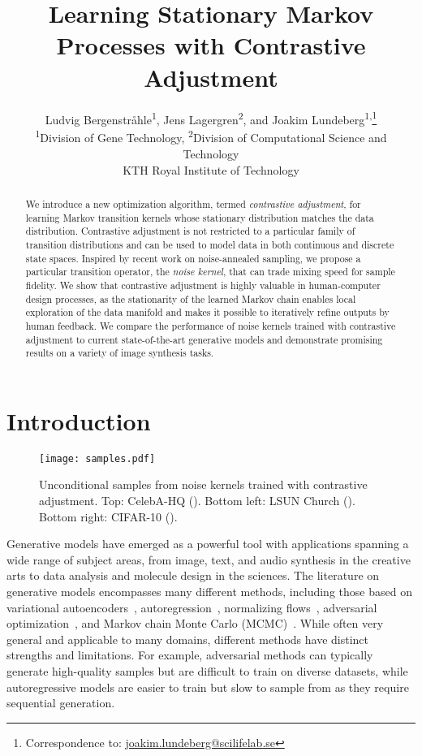 \documentclass[10pt,twocolumn,letterpaper]{article}
\title{Learning Stationary Markov Processes with Contrastive Adjustment}
\author{
  Ludvig Bergenstråhle\textsuperscript{1},
  Jens Lagergren\textsuperscript{2}, and
  Joakim Lundeberg\textsuperscript{1,}\thanks{Correspondence to: \href{mailto:joakim.lundeberg@scilifelab.se}{joakim.lundeberg@scilifelab.se}}
  \\
  {\small
    \textsuperscript{1}Division of Gene Technology,
    \textsuperscript{2}Division of Computational Science and Technology
  }
  \\
  {\small KTH Royal Institute of Technology}
}
\begin{document}
\maketitle

\begin{abstract}
  We introduce a new optimization algorithm, termed \emph{contrastive adjustment}, for learning Markov transition kernels whose stationary distribution matches the data distribution.
  Contrastive adjustment is not restricted to a particular family of transition distributions and can be used to model data in both continuous and discrete state spaces.
  Inspired by recent work on noise-annealed sampling, we propose a particular transition operator, the \emph{noise kernel}, that can trade mixing speed for sample fidelity.
  We show that contrastive adjustment is highly valuable in human-computer design processes, as the stationarity of the learned Markov chain enables local exploration of the data manifold and makes it possible to iteratively refine outputs by human feedback.
  We compare the performance of noise kernels trained with contrastive adjustment to current state-of-the-art generative models and demonstrate promising results on a variety of image synthesis tasks.
\end{abstract}


\section{Introduction}

\begin{figure}[t]
  \centering
  \texttt{[image: samples.pdf]}\caption{
    Unconditional samples from noise kernels trained with contrastive adjustment.
    Top: CelebA-HQ ().
    Bottom left: LSUN Church ().
    Bottom right: CIFAR-10 ().
  }\label{fig:ca:samples}
\end{figure}

Generative models have emerged as a powerful tool with applications spanning a wide range of subject areas, from image, text, and audio synthesis in the creative arts to data analysis and molecule design in the sciences.
The literature on generative models encompasses many different methods, including those based on variational autoencoders~\cite{kingma2013auto}, autoregression~\cite{oord2016conditional}, normalizing flows~\cite{rezende2015variational}, adversarial optimization~\cite{goodfellow2014generative}, and Markov chain Monte Carlo (MCMC)~\cite{song2019generative}.
While often very general and applicable to many domains, different methods have distinct strengths and limitations.
For example, adversarial methods can typically generate high-quality samples but are difficult to train on diverse datasets, while autoregressive models are easier to train but slow to sample from as they require sequential generation.
\end{document}
